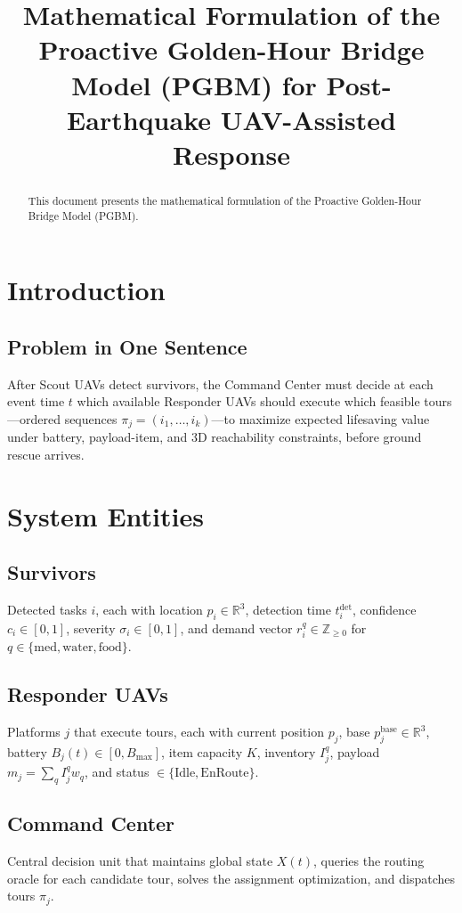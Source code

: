 \documentclass[conference]{IEEEtran}
\title{Mathematical Formulation of the Proactive Golden-Hour Bridge Model (PGBM) for Post-Earthquake UAV-Assisted Response}
\author{\IEEEauthorblockN{Author Name}
\IEEEauthorblockA{\textit{Department of Computer Science and Engineering}\\
\textit{University Name}\\
Email: author@email.com}
}
\begin{document}
\maketitle

\begin{abstract}
This document presents the mathematical formulation of the Proactive Golden-Hour Bridge Model (PGBM).
\end{abstract}

\section{Introduction}
\subsection{Problem in One Sentence}
After Scout UAVs detect survivors, the Command Center must decide at each event time $t$ which available Responder UAVs should execute which feasible tours---ordered sequences $\pi_j=(i_1,\dots,i_k)$---to maximize expected lifesaving value under battery, payload-item, and 3D reachability constraints, before ground rescue arrives.

\section{System Entities}

\subsection{Survivors}
Detected tasks $i$, each with location $p_i\in\mathbb{R}^3$, detection time $t_i^{\text{det}}$, confidence $c_i\in[0,1]$, severity $\sigma_i\in[0,1]$, and demand vector $r_i^q\in\mathbb{Z}_{\ge0}$ for $q\in\{\text{med},\text{water},\text{food}\}$.

\subsection{Responder UAVs}
Platforms $j$ that execute tours, each with current position $p_j$, base $p_j^{\text{base}}\in\mathbb{R}^3$, battery $B_j(t)\in[0,B_{\max}]$, item capacity $K$, inventory $I_j^q$, payload $m_j=\sum_q I_j^q w_q$, and status $\in\{\text{Idle},\text{EnRoute}\}$.

\subsection{Command Center}
Central decision unit that maintains global state $X(t)$, queries the routing oracle for each candidate tour, solves the assignment optimization, and dispatches tours $\pi_j$.
\end{document}
